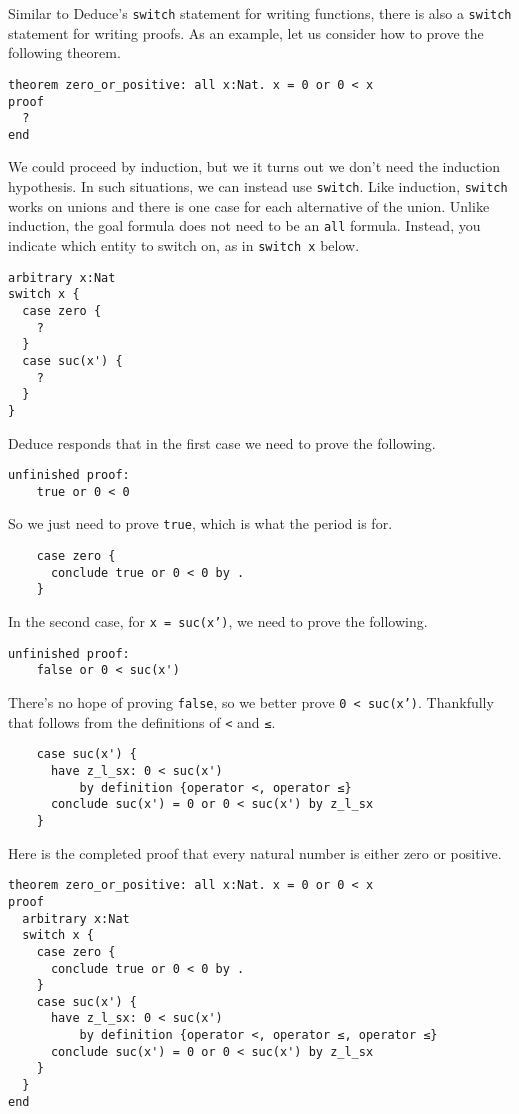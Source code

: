 \documentclass[12pt]{article}
\begin{document}
Similar to Deduce's \texttt{switch} statement for writing functions,
there is also a \texttt{switch} statement for writing proofs. As an
example, let us consider how to prove the following theorem.
\begin{verbatim}
theorem zero_or_positive: all x:Nat. x = 0 or 0 < x
proof
  ?
end
\end{verbatim}
We could proceed by induction, but we it turns out we don't need the
induction hypothesis. In such situations, we can instead use \texttt{switch}.
Like induction, \texttt{switch} works on unions and there is one case for
each alternative of the union. Unlike induction, the goal formula does
not need to be an \texttt{all} formula. Instead, you indicate which entity to
switch on, as in \texttt{switch x} below.
\begin{verbatim}
arbitrary x:Nat
switch x {
  case zero {
    ?
  }
  case suc(x') {
    ?
  }
}
\end{verbatim}
Deduce responds that in the first case we need to prove the following.
\begin{verbatim}
unfinished proof:
    true or 0 < 0
\end{verbatim}
So we just need to prove \texttt{true}, which is what the period is for.
\begin{verbatim}
    case zero {
      conclude true or 0 < 0 by .
    }
\end{verbatim}
In the second case, for \texttt{x = suc(x')}, we need to prove the following.
\begin{verbatim}
unfinished proof:
    false or 0 < suc(x')
\end{verbatim}
There's no hope of proving \texttt{false}, so we better prove
\texttt{0 < suc(x')}.  Thankfully that follows from the definitions of
\texttt{<} and \texttt{≤}.
\begin{verbatim}
    case suc(x') {
      have z_l_sx: 0 < suc(x')
          by definition {operator <, operator ≤}
      conclude suc(x') = 0 or 0 < suc(x') by z_l_sx
    }
\end{verbatim}
Here is the completed proof that every natural number is either zero
or positive.

\begin{verbatim}
theorem zero_or_positive: all x:Nat. x = 0 or 0 < x
proof
  arbitrary x:Nat
  switch x {
    case zero {
      conclude true or 0 < 0 by .
    }
    case suc(x') {
      have z_l_sx: 0 < suc(x') 
          by definition {operator <, operator ≤, operator ≤}
      conclude suc(x') = 0 or 0 < suc(x') by z_l_sx
    }
  }
end
\end{verbatim}
\end{document}
